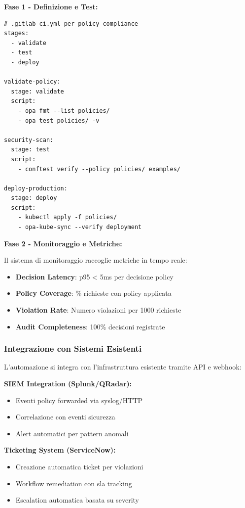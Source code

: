 \textbf{Fase 1 - Definizione e Test:}
\begin{lstlisting}[caption={Pipeline \gls{cicd} per Policy Compliance},label={lst:cicd_policy}]
# .gitlab-ci.yml per policy compliance
stages:
  - validate
  - test
  - deploy

validate-policy:
  stage: validate
  script:
    - opa fmt --list policies/
    - opa test policies/ -v
    
security-scan:
  stage: test
  script:
    - conftest verify --policy policies/ examples/
    
deploy-production:
  stage: deploy
  script:
    - kubectl apply -f policies/
    - opa-kube-sync --verify deployment
\end{lstlisting}

\textbf{Fase 2 - Monitoraggio e Metriche:}

Il sistema di monitoraggio raccoglie metriche in tempo reale:
\begin{itemize}
    \item \textbf{Decision Latency}: p95 < 5ms per decisione policy
    \item \textbf{Policy Coverage}: \% richieste con policy applicata
    \item \textbf{Violation Rate}: Numero violazioni per 1000 richieste
    \item \textbf{Audit Completeness}: 100\% decisioni registrate
\end{itemize}

\subsubsection{Integrazione con Sistemi Esistenti}

L'automazione si integra con l'infrastruttura esistente tramite API e webhook:

\textbf{SIEM Integration (Splunk/QRadar):}
\begin{itemize}
    \item Eventi policy forwarded via syslog/HTTP
    \item Correlazione con eventi sicurezza
    \item Alert automatici per pattern anomali
\end{itemize}

\textbf{Ticketing System (ServiceNow):}
\begin{itemize}
    \item Creazione automatica ticket per violazioni
    \item Workflow remediation con \gls{sla} tracking
    \item Escalation automatica basata su severity
\end{itemize}

